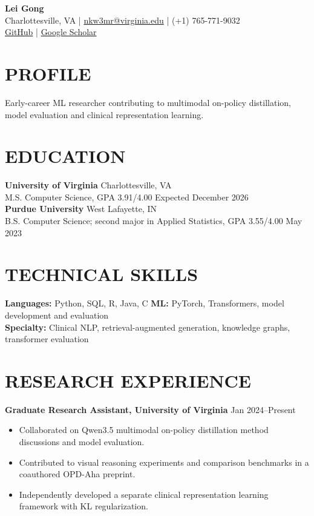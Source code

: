 \documentclass[10pt, letterpaper]{article}
\begin{document}
\setlength{\parindent}{0pt}
\begin{center}
{\fontsize{23}{25}\selectfont\textbf{Lei Gong}}\\[3pt]
Charlottesville, VA \quad | \quad \href{mailto:nkw3mr@virginia.edu}{nkw3mr@virginia.edu} \quad | \quad (+1) 765-771-9032\\[2pt]
\href{https://github.com/LeiGong0125Carrot}{GitHub} \quad | \quad \href{https://scholar.google.com/citations?user=8QLAkKMAAAAJ}{Google Scholar}
\end{center}
\vspace{-3mm}
\section{PROFILE}
Early-career ML researcher contributing to multimodal on-policy distillation, model evaluation and clinical representation learning.
\section{EDUCATION}
\textbf{University of Virginia} \hfill Charlottesville, VA \\
M.S. Computer Science, GPA 3.91/4.00 \hfill Expected December 2026\\[1pt]
\textbf{Purdue University} \hfill West Lafayette, IN \\
B.S. Computer Science; second major in Applied Statistics, GPA 3.55/4.00 \hfill May 2023
\section{TECHNICAL SKILLS}
\textbf{Languages:} Python, SQL, R, Java, C \quad \textbf{ML:} PyTorch, Transformers, model development and evaluation\\
\textbf{Specialty:} Clinical NLP, retrieval-augmented generation, knowledge graphs, transformer evaluation
\section{RESEARCH EXPERIENCE}
\textbf{Graduate Research Assistant, University of Virginia} \hfill Jan 2024--Present
\begin{itemize}
\item Collaborated on Qwen3.5 multimodal on-policy distillation method discussions and model evaluation.
\item Contributed to visual reasoning experiments and comparison benchmarks in a coauthored OPD-Aha preprint.
\item Independently developed a separate clinical representation learning framework with KL regularization.
\end{itemize}
\end{document}
